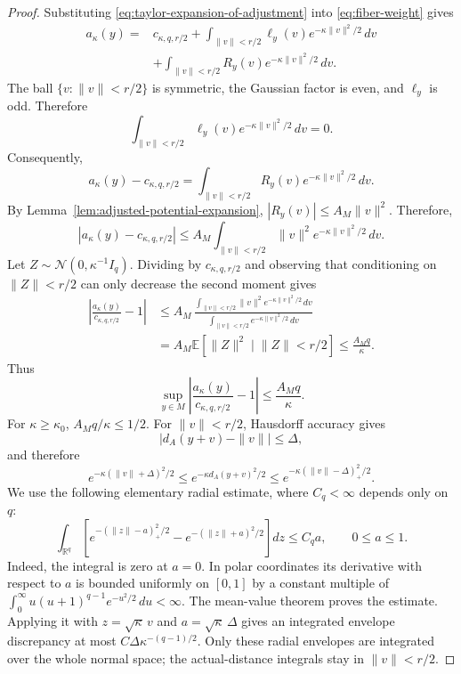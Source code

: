 \documentclass{article}
\newcommand{\E}{\mathbb E}
\numberwithin{equation}{section}
\begin{document}
\begin{proof}
{\color{black}
Substituting \eqref{eq:taylor-expansion-of-adjustment} into \eqref{eq:fiber-weight} gives
}
\begin{align*}
 a_\kappa(y)
 ={}&c_{\kappa,q,r/2}
 +\int_{\lVert v\rVert<r/2}\ell_y(v)
 e^{-\kappa\lVert v\rVert^2/2}\,dv\\
 &+\int_{\lVert v\rVert<r/2}R_y(v)
 e^{-\kappa\lVert v\rVert^2/2}\,dv.
\end{align*}
The ball $\{v:\lVert v\rVert<r/2\}$ is symmetric, the Gaussian factor is
even, and $\ell_y$ is odd.  Therefore
\[
 \int_{\lVert v\rVert<r/2}\ell_y(v)  e^{-\kappa\lVert v\rVert^2/2}\,dv =0.
\]
Consequently,
\[
 a_\kappa(y)-c_{\kappa,q,r/2}
 =\int_{\lVert v\rVert<r/2}R_y(v)
 e^{-\kappa\lVert v\rVert^2/2}\,dv.
\]
{\color{black}
By Lemma~\ref{lem:adjusted-potential-expansion},
$|R_y(v)|\le A_M\lVert v\rVert^2$. Therefore,
}
\[
 |a_\kappa(y)-c_{\kappa,q,r/2}|
 \le A_M\int_{\lVert v\rVert<r/2}\lVert v\rVert^2
 e^{-\kappa\lVert v\rVert^2/2}\,dv.
\]
Let $Z\sim\mathcal N(0,\kappa^{-1}I_q)$. Dividing by
$c_{\kappa,q,r/2}$ and observing that conditioning on $\lVert Z\rVert<r/2$
can only decrease the second moment gives
\begin{align*}
 \left|\frac{a_\kappa(y)}{c_{\kappa,q,r/2}}-1\right|
 &\le A_M\,
 \frac{\int_{\lVert v\rVert<r/2}\lVert v\rVert^2
 e^{-\kappa\lVert v\rVert^2/2}\,dv}
 {\int_{\lVert v\rVert<r/2}e^{-\kappa\lVert v\rVert^2/2}\,dv}\\
 &=A_M\E\!\left[\lVert Z\rVert^2
 \mid \lVert Z\rVert<r/2\right]
 \le\frac{A_Mq}{\kappa}.
\end{align*}
Thus
\begin{equation}
 \sup_{y\in M}
 \left|\frac{a_\kappa(y)}{c_{\kappa,q,r/2}}-1\right|
 \le\frac{A_Mq}{\kappa}.
\label{eq:fiber-uniformity}
\end{equation}
For $\kappa\ge\kappa_0$, $A_Mq/\kappa\le1/2$.
For $\|v\|<r/2$, Hausdorff accuracy gives
\[
 |d_A(y+v)-\|v\||\le\Delta,
\]
and therefore
\begin{equation}
 e^{-\kappa(\|v\|+\Delta)^2/2}
 \le e^{-\kappa d_A(y+v)^2/2}
 \le e^{-\kappa(\|v\|-\Delta)_+^2/2}.
\label{eq:gaussian-distance-envelopes}
\end{equation}
We use the following elementary radial estimate, where $C_q<\infty$
depends only on $q$:
\[
 \int_{\mathbb R^q}
 \left[
 e^{-(\|z\|-a)_+^2/2}-e^{-(\|z\|+a)^2/2}
 \right]dz
 \le C_q a,\qquad 0\le a\le1.
\]
Indeed, the integral is zero at $a=0$. In polar coordinates its
derivative with respect to $a$ is bounded uniformly on $[0,1]$ by a
constant multiple of
$\int_0^\infty u(u+1)^{q-1}e^{-u^2/2}\,du<\infty$.
The mean-value theorem proves the estimate.
Applying it with $z=\sqrt\kappa\,v$ and $a=\sqrt\kappa\,\Delta$
gives an integrated envelope discrepancy at most
$C\Delta\kappa^{-(q-1)/2}$.
Only these radial envelopes are integrated over the whole normal
space; the actual-distance integrals stay in $\|v\|<r/2$.


\end{proof}
\end{document}
